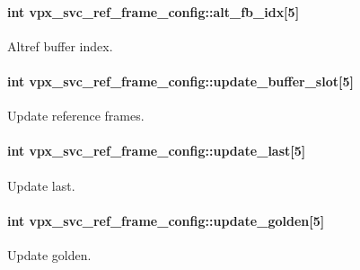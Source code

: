 \paragraph[{\texorpdfstring{alt\+\_\+fb\+\_\+idx}{alt_fb_idx}}]{\setlength{\rightskip}{0pt plus 5cm}int vpx\+\_\+svc\+\_\+ref\+\_\+frame\+\_\+config\+::alt\+\_\+fb\+\_\+idx\mbox{[}5\mbox{]}}\hypertarget{structvpx__svc__ref__frame__config_ab2a913dc166956efad8bdf6ad009b2eb}{}\label{structvpx__svc__ref__frame__config_ab2a913dc166956efad8bdf6ad009b2eb}
Altref buffer index. 
\paragraph[{\texorpdfstring{update\+\_\+buffer\+\_\+slot}{update_buffer_slot}}]{\setlength{\rightskip}{0pt plus 5cm}int vpx\+\_\+svc\+\_\+ref\+\_\+frame\+\_\+config\+::update\+\_\+buffer\+\_\+slot\mbox{[}5\mbox{]}}\hypertarget{structvpx__svc__ref__frame__config_a3ff7ebe7b8056278efbbb9abae4d830a}{}\label{structvpx__svc__ref__frame__config_a3ff7ebe7b8056278efbbb9abae4d830a}
Update reference frames. 
\paragraph[{\texorpdfstring{update\+\_\+last}{update_last}}]{\setlength{\rightskip}{0pt plus 5cm}int vpx\+\_\+svc\+\_\+ref\+\_\+frame\+\_\+config\+::update\+\_\+last\mbox{[}5\mbox{]}}\hypertarget{structvpx__svc__ref__frame__config_a8c6315e853ebf15e3e621332d77f4232}{}\label{structvpx__svc__ref__frame__config_a8c6315e853ebf15e3e621332d77f4232}
Update last. 
\paragraph[{\texorpdfstring{update\+\_\+golden}{update_golden}}]{\setlength{\rightskip}{0pt plus 5cm}int vpx\+\_\+svc\+\_\+ref\+\_\+frame\+\_\+config\+::update\+\_\+golden\mbox{[}5\mbox{]}}\hypertarget{structvpx__svc__ref__frame__config_ae97b52fa83d6589a1efdae7f2747fe72}{}\label{structvpx__svc__ref__frame__config_ae97b52fa83d6589a1efdae7f2747fe72}
Update golden. 

